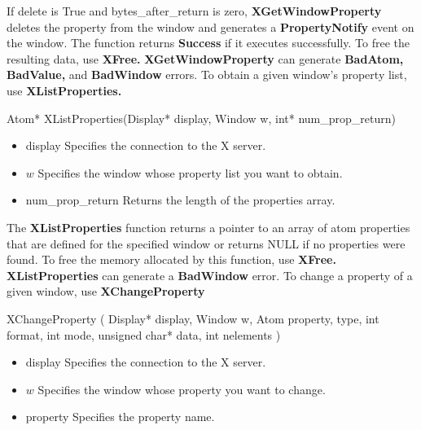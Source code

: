 \documentclass{report}
\begin{document}
\begin{itemize}
        \bigbreak \noindent 
        If delete is True and bytes\_after\_return is zero, \textbf{XGetWindowProperty} deletes the property
        from the window and generates a \textbf{PropertyNotify} event on the window.
        \bigbreak \noindent 
        The function returns \textbf{Success} if it executes successfully. To free the resulting data, use \textbf{XFree.}
        \bigbreak \noindent 
        \textbf{XGetWindowProperty} can generate \textbf{BadAtom,} \textbf{BadValue,} and \textbf{BadWindow} errors.
        \bigbreak \noindent 
        To obtain a given window’s property list, use \textbf{XListProperties.}
        \bigbreak \noindent 
        \begin{cppcode}
            Atom* XListProperties(Display* display, Window w, int* num_prop_return)
        \end{cppcode}
        \begin{itemize}
            \item display Specifies the connection to the X server.
            \item $w$ Specifies the window whose property list you want to obtain.
            \item num\_prop\_return Returns the length of the properties array.
        \end{itemize}
        The \textbf{XListProperties} function returns a pointer to an array of atom properties that are defined for the specified window or returns NULL if no properties were found. To free the memory allocated by this function, use \textbf{XFree.}
        \bigbreak \noindent 
        \textbf{XListProperties} can generate a \textbf{BadWindow} error.
        \bigbreak \noindent 
        To change a property of a given window, use \textbf{XChangeProperty}
        \bigbreak \noindent 
        \begin{cppcode}
            XChangeProperty (
                Display* display,
                Window w,
                Atom property, type,
                int format,
                int mode,
                unsigned char* data,
                int nelements
            )
        \end{cppcode}
        \begin{itemize}
            \item display Specifies the connection to the X server.
            \item $w$ Specifies the window whose property you want to change.
            \item property Specifies the property name.

\end{itemize}
\end{itemize}
\end{document}
